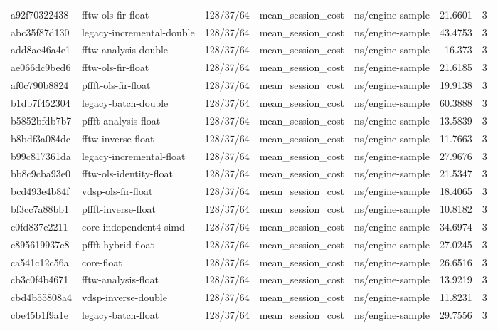 \begin{longtable}{lllllrr}
a92f70322438 & fftw-ols-fir-float & 128/37/64 & mean\_session\_cost & ns/engine-sample & 21.6601 & 3 \\
abc35f87d130 & legacy-incremental-double & 128/37/64 & mean\_session\_cost & ns/engine-sample & 43.4753 & 3 \\
add8ae46a4e1 & fftw-analysis-double & 128/37/64 & mean\_session\_cost & ns/engine-sample & 16.373 & 3 \\
ae066dc9bed6 & fftw-ols-fir-float & 128/37/64 & mean\_session\_cost & ns/engine-sample & 21.6185 & 3 \\
af0c790b8824 & pffft-ols-fir-float & 128/37/64 & mean\_session\_cost & ns/engine-sample & 19.9138 & 3 \\
b1db7f452304 & legacy-batch-double & 128/37/64 & mean\_session\_cost & ns/engine-sample & 60.3888 & 3 \\
b5852bfdb7b7 & pffft-analysis-float & 128/37/64 & mean\_session\_cost & ns/engine-sample & 13.5839 & 3 \\
b8bdf3a084dc & fftw-inverse-float & 128/37/64 & mean\_session\_cost & ns/engine-sample & 11.7663 & 3 \\
b99c817361da & legacy-incremental-float & 128/37/64 & mean\_session\_cost & ns/engine-sample & 27.9676 & 3 \\
bb8c9cba93e0 & fftw-ols-identity-float & 128/37/64 & mean\_session\_cost & ns/engine-sample & 21.5347 & 3 \\
bcd493e4b84f & vdsp-ols-fir-float & 128/37/64 & mean\_session\_cost & ns/engine-sample & 18.4065 & 3 \\
bf3cc7a88bb1 & pffft-inverse-float & 128/37/64 & mean\_session\_cost & ns/engine-sample & 10.8182 & 3 \\
c0fd837e2211 & core-independent4-simd & 128/37/64 & mean\_session\_cost & ns/engine-sample & 34.6974 & 3 \\
c895619937c8 & pffft-hybrid-float & 128/37/64 & mean\_session\_cost & ns/engine-sample & 27.0245 & 3 \\
ca541c12c56a & core-float & 128/37/64 & mean\_session\_cost & ns/engine-sample & 26.6516 & 3 \\
cb3c0f4b4671 & fftw-analysis-float & 128/37/64 & mean\_session\_cost & ns/engine-sample & 13.9219 & 3 \\
cbd4b55808a4 & vdsp-inverse-double & 128/37/64 & mean\_session\_cost & ns/engine-sample & 11.8231 & 3 \\
cbe45b1f9a1e & legacy-batch-float & 128/37/64 & mean\_session\_cost & ns/engine-sample & 29.7556 & 3 \\

\end{longtable}
